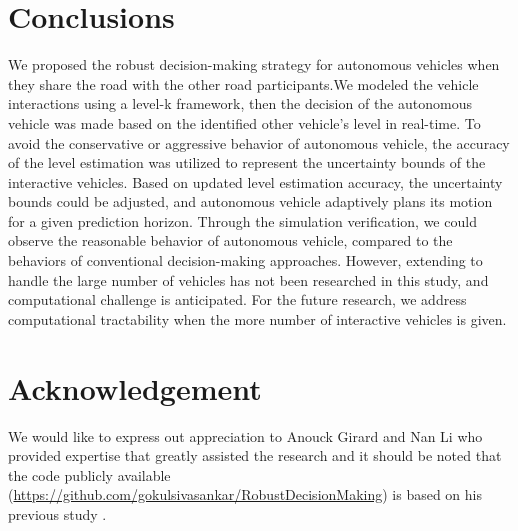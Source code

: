 \documentclass[10pt,journal]{IEEEtran}
\begin{document}
	\section{Conclusions}
	\label{sec:conclusions}
	We proposed the robust decision-making strategy for autonomous vehicles when they share the road with the other road participants.We modeled the vehicle interactions using a level-k framework, then the decision of the autonomous vehicle was made based on the identified other vehicle's level in real-time. To avoid the conservative or aggressive behavior of autonomous vehicle, the accuracy of the level estimation was utilized to represent the uncertainty bounds of the interactive vehicles. Based on updated level estimation accuracy, the uncertainty bounds could be adjusted, and autonomous vehicle adaptively plans its motion for a given prediction horizon. Through the simulation verification, we could observe the reasonable behavior of autonomous vehicle, compared to the behaviors of conventional decision-making approaches. However, extending to handle the large number of vehicles has not been researched in this study, and computational challenge is anticipated. For the future research, we address computational tractability when the more number of interactive vehicles is given.


	\section*{Acknowledgement}
	We would like to express out appreciation to Anouck Girard and Nan Li who provided expertise that greatly assisted the research and it should be noted that the code publicly available (\url{https://github.com/gokulsivasankar/RobustDecisionMaking}) is based on his previous study \cite{Li2018}.




	
	
	
\end{document}
